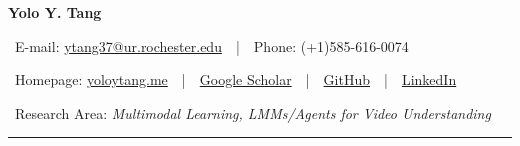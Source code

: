 \documentclass{resume}
\begin{document}

    {\fontsize{18}{18}\selectfont\textbf{Yolo Y. Tang}}


~E-mail: \href{mailto:ytang37@ur.rochester.edu}{ytang37@ur.rochester.edu}~~|~~Phone: (+1)585-616-0074

~Homepage: \href{https://yoloytang.me/}{yoloytang.me}~~|~~\href{https://scholar.google.com/citations?user=xf1rCgoAAAAJ}{Google Scholar}~~|~~\href{https://github.com/yoloytang}{GitHub}~~|~~\href{https://www.linkedin.com/in/yunlong-yolo-tang/}{LinkedIn}

~Research Area: \textit{Multimodal Learning, LMMs/Agents for Video Understanding}

\vspace{10pt}
\hrule







\end{document}
